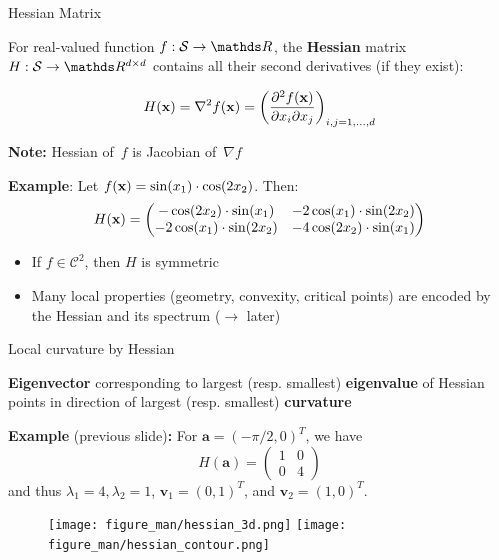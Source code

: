 \documentclass[11pt,compress,t,notes=noshow, xcolor=table]{beamer}
\begin{document}
\begin{vbframe}{Hessian Matrix}

For real-valued function $f:\mathcal{S} \to \R$, the \textbf{Hessian} matrix $H:\mathcal{S} \to \R^{d \times d}$ contains all their second derivatives (if they exist):

\begin{equation*}
    H(\mathbf{x}) =\nabla^2 f(\mathbf{x}) = \left(\frac{\partial^2 f(\mathbf{x})}{\partial x_i \partial x_j}\right)_{i,j=1,\ldots,d}
\end{equation*}
  
\medskip

\textbf{Note:} Hessian of~$f$ is Jacobian of~$\nabla f$

\medskip

\textbf{Example}: Let $f(\mathbf{x}) = \sin(x_1) \cdot \cos(2x_2)$.
Then:
\begin{equation*}
    H(\mathbf{x}) = \begin{pmatrix}
        -\cos(2x_2)\cdot\sin(x_1) & -2\cos(x_1)\cdot\sin(2x_2) \\
        -2\cos(x_1)\cdot\sin(2x_2) & -4\cos(2x_2)\cdot\sin(x_1) 
    \end{pmatrix}
\end{equation*}

\begin{itemize}
    \item If $f\in\mathcal{C}^2$, then $H$ is symmetric
    \item Many local properties (geometry, convexity, critical points) are encoded by the Hessian and its spectrum ($\rightarrow$ later)
\end{itemize}

\end{vbframe}


\begin{vbframe}{Local curvature by Hessian}

\textbf{Eigenvector} corresponding to largest (resp. smallest) \textbf{eigenvalue} of Hessian points in direction of largest (resp. smallest) \textbf{curvature}

\lz

\textbf{Example} (previous slide)\textbf{:}
For $\bm{a}=(-\pi/2,0)^T$, we have
\begin{equation*}
    H(\bm{a}) = \begin{pmatrix}
        1 & 0 \\ 0 & 4
    \end{pmatrix}
\end{equation*}
and thus $\lambda_{1}=4, \lambda_{2}=1$, $\bm{v}_{1}=(0, 1)^T$, and $\bm{v}_{2}=(1, 0)^T$.

\begin{figure}
    \texttt{[image: figure\_man/hessian\_3d.png]}
    \hspace{0.5cm}
    \texttt{[image: figure\_man/hessian\_contour.png]}
\end{figure}

\end{vbframe}
\end{document}
